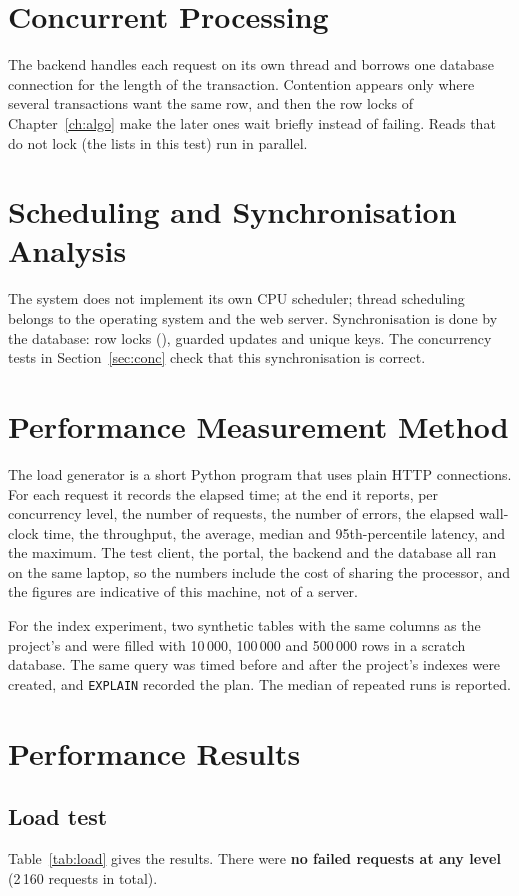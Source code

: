 \section{Concurrent Processing}
The backend handles each request on its own thread and borrows one database connection
for the length of the transaction. Contention appears only where several transactions
want the same row, and then the row locks of Chapter~\ref{ch:algo} make the later ones wait
briefly instead of failing. Reads that do not lock (the lists in this test) run in parallel.

\section{Scheduling and Synchronisation Analysis}
The system does not implement its own CPU scheduler; thread scheduling belongs to the
operating system and the web server. Synchronisation is done by the database: row locks
(), guarded updates and unique keys. The concurrency tests in
Section~\ref{sec:conc} check that this synchronisation is correct.

\section{Performance Measurement Method}
The load generator is a short Python program that uses plain HTTP connections. For each
request it records the elapsed time; at the end it reports, per concurrency level, the
number of requests, the number of errors, the elapsed wall-clock time, the throughput, the
average, median and 95th-percentile latency, and the maximum. The test client, the portal,
the backend and the database all ran on the same laptop, so the numbers include the cost of
sharing the processor, and the figures are indicative of this machine, not of a server.

For the index experiment, two synthetic tables with the same columns as the project's
 and  were filled with 10\,000, 100\,000 and
500\,000 rows in a scratch database. The same query was timed before and after the
project's indexes were created, and \texttt{EXPLAIN} recorded the plan. The median of
repeated runs is reported.

\section{Performance Results}
\subsection{Load test}\label{sec:loadres}
Table~\ref{tab:load} gives the results. There were \textbf{no failed requests at any
level} (2\,160 requests in total).

